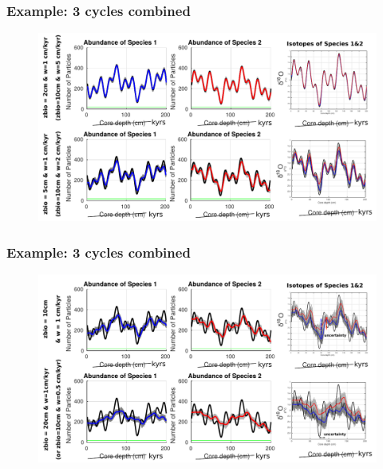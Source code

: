 \documentclass{beamer}
\begin{document}
\begin{frame}
\frametitle{Example: 3 cycles combined}
\begin{figure}[hbtp]
\hspace*{-0.8cm}\includegraphics[width=1.1\textwidth]{figures/Allcycles_combined_2+5cm_background.pdf}%
\end{figure}
\end{frame}

\begin{frame}
\frametitle{Example: 3 cycles combined}
\begin{figure}[hbtp]
\hspace*{-0.8cm}\includegraphics[width=1.1\textwidth]{figures/Allcycles_combined_10+20cm_background.pdf}%
\end{figure}
\end{frame}
\end{document}
